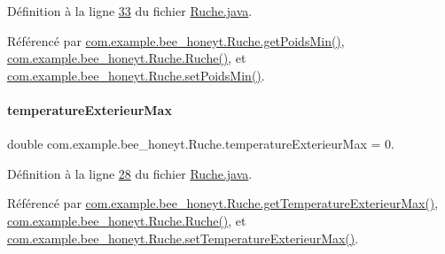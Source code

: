 Définition à la ligne \hyperlink{_ruche_8java_source_l00033}{33} du fichier \hyperlink{_ruche_8java_source}{Ruche.\+java}.



Référencé par \hyperlink{_ruche_8java_source_l00209}{com.\+example.\+bee\+\_\+honeyt.\+Ruche.\+get\+Poids\+Min()}, \hyperlink{_ruche_8java_source_l00044}{com.\+example.\+bee\+\_\+honeyt.\+Ruche.\+Ruche()}, et \hyperlink{_ruche_8java_source_l00214}{com.\+example.\+bee\+\_\+honeyt.\+Ruche.\+set\+Poids\+Min()}.

\mbox{\label{classcom_1_1example_1_1bee__honeyt_1_1_ruche_afd45ecd796457b633615488195153114}} 
\paragraph{\texorpdfstring{temperature\+Exterieur\+Max}{temperatureExterieurMax}}
{\footnotesize\ttfamily double com.\+example.\+bee\+\_\+honeyt.\+Ruche.\+temperature\+Exterieur\+Max = 0.\hspace{0.3cm}{\ttfamily [private]}}



Définition à la ligne \hyperlink{_ruche_8java_source_l00028}{28} du fichier \hyperlink{_ruche_8java_source}{Ruche.\+java}.



Référencé par \hyperlink{_ruche_8java_source_l00159}{com.\+example.\+bee\+\_\+honeyt.\+Ruche.\+get\+Temperature\+Exterieur\+Max()}, \hyperlink{_ruche_8java_source_l00044}{com.\+example.\+bee\+\_\+honeyt.\+Ruche.\+Ruche()}, et \hyperlink{_ruche_8java_source_l00164}{com.\+example.\+bee\+\_\+honeyt.\+Ruche.\+set\+Temperature\+Exterieur\+Max()}.

\mbox{\label{classcom_1_1example_1_1bee__honeyt_1_1_ruche_a6e88eae7cc58b7c7ca3846d789fe1c2b}} 
